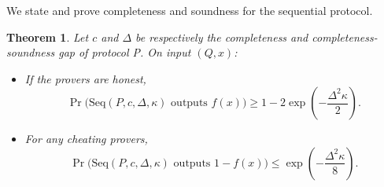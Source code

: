 \documentclass[11pt]{article}
\newtheorem{theorem}{Theorem}
\begin{document}
\noindent We state and prove completeness and soundness for the sequential protocol.

\begin{theorem}
Let $c$ and $\Delta$ be respectively the completeness and completeness-soundness gap of protocol P. On input $(Q,x)$:
\begin{itemize}
\item If the provers are honest, $$ \Pr\big(\mbox{Seq}(P, c, \Delta, \kappa) \mbox{  outputs } f(x)\big) \geq 1 - 2\exp \left(-\frac{\Delta^2\kappa}{2}\right) .$$ 
\item For any cheating provers, $$\Pr\big(\mbox{Seq}(P, c, \Delta, \kappa) \mbox{  outputs } 1-f(x)\big) \leq \exp \left(-\frac{\Delta^2\kappa}{8}\right) .$$
\end{itemize}

\end{theorem}
\end{document}

